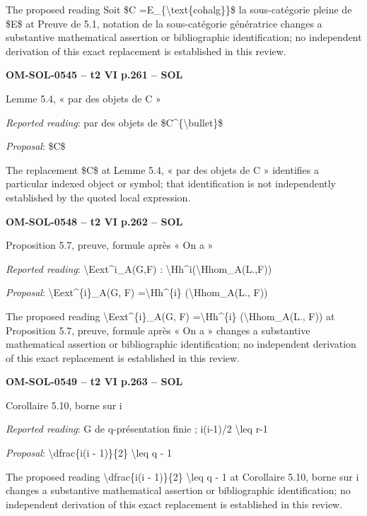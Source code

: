 The proposed reading Soit \$C =\allowbreak  E\_\{\textbackslash{}text\{cohalg\}\}\$ la sous-catégorie pleine de \$E\$ at Preuve de 5.1, notation de la sous-catégorie génératrice changes a substantive mathematical assertion or bibliographic identification; no independent derivation of this exact replacement is established in this review.\par
\par\noindent\textbf{OM-SOL-0545 -- t2 VI p.261 -- SOL}\par
Lemme 5.4, « par des objets de C »\par
\emph{Reported reading}: par des objets de \$C\textasciicircum{}\{\textbackslash{}bullet\}\$\par
\emph{Proposal}: \$C\$\par
The replacement \$C\$ at Lemme 5.4, « par des objets de C » identifies a particular indexed object or symbol; that identification is not independently established by the quoted local expression.\par
\par\noindent\textbf{OM-SOL-0548 -- t2 VI p.262 -- SOL}\par
Proposition 5.7, preuve, formule après « On a »\par
\emph{Reported reading}: \textbackslash{}Eext\textasciicircum{}i\_A(G,F) : \textbackslash{}Hh\textasciicircum{}i(\textbackslash{}Hhom\_A(L.,F))\par
\emph{Proposal}: \textbackslash{}Eext\textasciicircum{}\{i\}\_A(G, F) =\allowbreak  \textbackslash{}Hh\textasciicircum{}\{i\} (\textbackslash{}Hhom\_A(L., F))\par
The proposed reading \textbackslash{}Eext\textasciicircum{}\{i\}\_A(G, F) =\allowbreak  \textbackslash{}Hh\textasciicircum{}\{i\} (\textbackslash{}Hhom\_A(L., F)) at Proposition 5.7, preuve, formule après « On a » changes a substantive mathematical assertion or bibliographic identification; no independent derivation of this exact replacement is established in this review.\par
\par\noindent\textbf{OM-SOL-0549 -- t2 VI p.263 -- SOL}\par
Corollaire 5.10, borne sur i\par
\emph{Reported reading}: G de q-présentation finie ; i(i-1)/2 \textbackslash{}leq r-1\par
\emph{Proposal}: \textbackslash{}dfrac\{i(i - 1)\}\{2\} \textbackslash{}leq q - 1\par
The proposed reading \textbackslash{}dfrac\{i(i - 1)\}\{2\} \textbackslash{}leq q - 1 at Corollaire 5.10, borne sur i changes a substantive mathematical assertion or bibliographic identification; no independent derivation of this exact replacement is established in this review.\par

